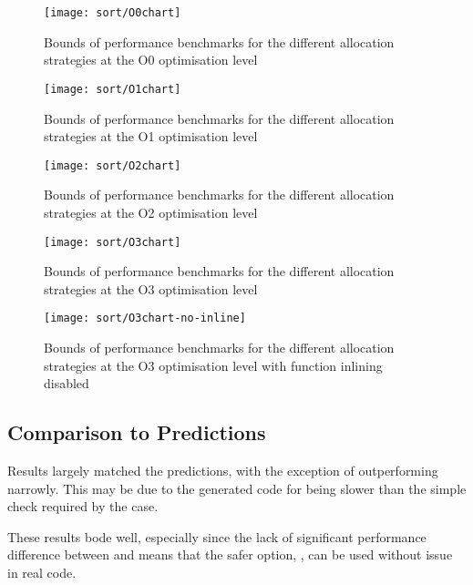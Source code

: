 \begin{figure}[ph]
	\centering
	\texttt{[image: sort/O0chart]}
	\caption{Bounds of performance benchmarks for the different allocation strategies at the O0 optimisation level}\label{firstsort}
\end{figure}

\begin{figure}[ph]
	\centering
	\texttt{[image: sort/O1chart]}
	\caption{Bounds of performance benchmarks for the different allocation strategies at the O1 optimisation level}\label{sortO1}
\end{figure}

\begin{figure}[ph]
	\centering
	\texttt{[image: sort/O2chart]}
	\caption{Bounds of performance benchmarks for the different allocation strategies at the O2 optimisation level}\label{sortO2}
\end{figure}

\begin{figure}[ph]
	\centering
	\texttt{[image: sort/O3chart]}
	\caption{Bounds of performance benchmarks for the different allocation strategies at the O3 optimisation level}\label{sortO3}
\end{figure}

\begin{figure}[ph]
	\centering
	\texttt{[image: sort/O3chart-no-inline]}
	\caption{Bounds of performance benchmarks for the different allocation strategies at the O3 optimisation level with function inlining disabled}\label{lastsort}
\end{figure}

\subsection{Comparison to Predictions}

Results largely matched the predictions, with the exception of  outperforming  narrowly. This may be due to the generated code for  being slower than the simple check required by the  case.

These results bode well, especially since the lack of significant performance difference between  and  means that the safer option, , can be used without issue in real code.


